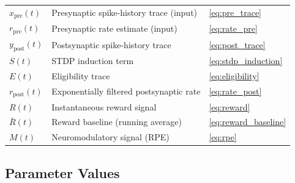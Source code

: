 \documentclass[11pt]{article}
\theoremstyle{definition}
\begin{document}
\begin{table}[ht]
\begin{tabular}{@{}lll@{}}
$x_{\mathrm{pre}}(t)$ & Presynaptic spike-history trace (input)  & \eqref{eq:pre_trace} \\
$r_{\mathrm{pre}}(t)$ & Presynaptic rate estimate (input)        & \eqref{eq:rate_pre} \\
$y_{\mathrm{post}}(t)$ & Postsynaptic spike-history trace         & \eqref{eq:post_trace} \\
$S(t)$              & STDP induction term                          & \eqref{eq:stdp_induction} \\
$E(t)$              & Eligibility trace                            & \eqref{eq:eligibility} \\
$r_{\mathrm{post}}(t)$ & Exponentially filtered postsynaptic rate & \eqref{eq:rate_post} \\
$R(t)$              & Instantaneous reward signal                  & \eqref{eq:reward} \\
$\bar{R}(t)$        & Reward baseline (running average)             & \eqref{eq:reward_baseline} \\
$M(t)$              & Neuromodulatory signal (RPE)                 & \eqref{eq:rpe} \\
\bottomrule
\end{tabular}
\end{table}

\subsection{Parameter Values}
\end{document}
